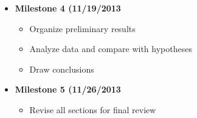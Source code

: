 \begin{itemize}
\item \textbf{Milestone 4 (11/19/2013}
\begin{itemize}
\item Organize preliminary results
\item Analyze data and compare with hypotheses
\item Draw conclusions
\end{itemize}

\item \textbf{Milestone 5 (11/26/2013}
\begin{itemize}
\item Revise all sections for final review
\end{itemize}

\end{itemize}
